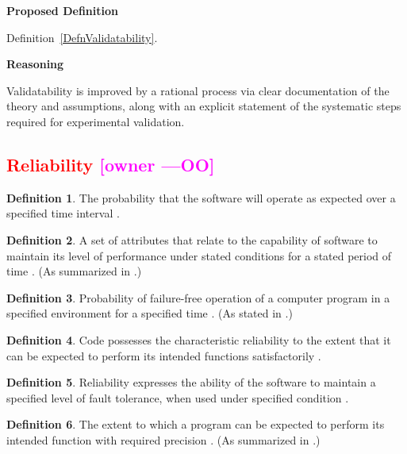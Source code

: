\documentclass[letterpaper,cleveref]{lipics-v2019}
\newcommand{\authornote}[3]{\textcolor{#1}{[#3 ---#2]}}
\newcommand{\authornote}[3]{}
\newcommand{\oo}[1]{\authornote{magenta}{OO}{#1}} %
\newcommand{\notdone}[1]{\textcolor{red}{#1}}
\theoremstyle{definition}
\newtheorem{defn}{Definition}
\begin{document}
\noindent \textbf{Proposed Definition}

Definition~\ref{DefnValidatability}.

\noindent \textbf{Reasoning}

Validatability is improved by a rational process via clear documentation of the
theory and assumptions, along with an explicit statement of the systematic steps
required for experimental validation.

\subsection{\notdone{Reliability} \oo{owner}}

\begin{defn}
	The probability that the software will operate as expected over a specified
	time interval \citep{GhezziEtAl2003}.
\end{defn}

\begin{defn}
	A set of attributes that relate to the capability of software to maintain its
	level of performance under stated conditions for a stated period of time \citep{iso2001iec}. (As summarized in \citet{berander2005software}.)
\end{defn}

\begin{defn} \label{reliabilitySelected1}
	Probability of failure-free operation of a computer program in a specified environment for a specified time \citep{musa1987software}. (As stated in \citet{pressman2005software}.)
\end{defn}

\begin{defn}
	Code possesses the characteristic reliability to the extent that it can be
	expected to perform its intended functions satisfactorily
	\citep{boehm1976quantitative}.
\end{defn}

\begin{defn} \label{reliabilitySelected2}
   Reliability expresses the ability of the software to maintain a specified
   level of fault tolerance, when used under specified condition \citep{singh2013different}.
\end{defn}
\begin{defn}
	The extent to which a program can be expected to perform its intended
	function with required precision \citep{McCallEtAl1977}. (As summarized in
    \citet{VanVliet2000}.)
\end{defn}
\end{document}
